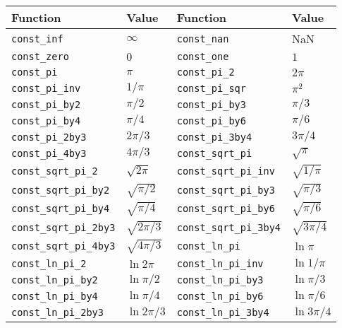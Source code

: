 \begin{table}
  \begin{tabularx}{\textwidth}{p{1.2in}Lp{1.2in}L}
    \toprule
    Function & Value & Function & Value \\
    \midrule
    \verb|const_inf|          & $\infty$        &
    \verb|const_nan|          & NaN             \\
    \verb|const_zero|         & $0$             &
    \verb|const_one|          & $1$             \\
    \verb|const_pi|           & $\pi$           &
    \verb|const_pi_2|         & $2\pi$          \\
    \verb|const_pi_inv|       & $1/\pi$         &
    \verb|const_pi_sqr|       & $\pi^2$         \\
    \verb|const_pi_by2|       & $\pi/2$         &
    \verb|const_pi_by3|       & $\pi/3$         \\
    \verb|const_pi_by4|       & $\pi/4$         &
    \verb|const_pi_by6|       & $\pi/6$         \\
    \verb|const_pi_2by3|      & $2\pi/3$        &
    \verb|const_pi_3by4|      & $3\pi/4$        \\
    \verb|const_pi_4by3|      & $4\pi/3$        &
    \verb|const_sqrt_pi|      & $\sqrt{\pi}$    \\
    \verb|const_sqrt_pi_2|    & $\sqrt{2\pi}$   &
    \verb|const_sqrt_pi_inv|  & $\sqrt{1/\pi}$  \\
    \verb|const_sqrt_pi_by2|  & $\sqrt{\pi/2}$  &
    \verb|const_sqrt_pi_by3|  & $\sqrt{\pi/3}$  \\
    \verb|const_sqrt_pi_by4|  & $\sqrt{\pi/4}$  &
    \verb|const_sqrt_pi_by6|  & $\sqrt{\pi/6}$  \\
    \verb|const_sqrt_pi_2by3| & $\sqrt{2\pi/3}$ &
    \verb|const_sqrt_pi_3by4| & $\sqrt{3\pi/4}$ \\
    \verb|const_sqrt_pi_4by3| & $\sqrt{4\pi/3}$ &
    \verb|const_ln_pi|        & $\ln{\pi}$      \\
    \verb|const_ln_pi_2|      & $\ln{2\pi}$     &
    \verb|const_ln_pi_inv|    & $\ln{1/\pi}$    \\
    \verb|const_ln_pi_by2|    & $\ln{\pi/2}$    &
    \verb|const_ln_pi_by3|    & $\ln{\pi/3}$    \\
    \verb|const_ln_pi_by4|    & $\ln{\pi/4}$    &
    \verb|const_ln_pi_by6|    & $\ln{\pi/6}$    \\
    \verb|const_ln_pi_2by3|   & $\ln{2\pi/3}$   &
    \verb|const_ln_pi_3by4|   & $\ln{3\pi/4}$   \\

\end{tabularx}
\end{table}
